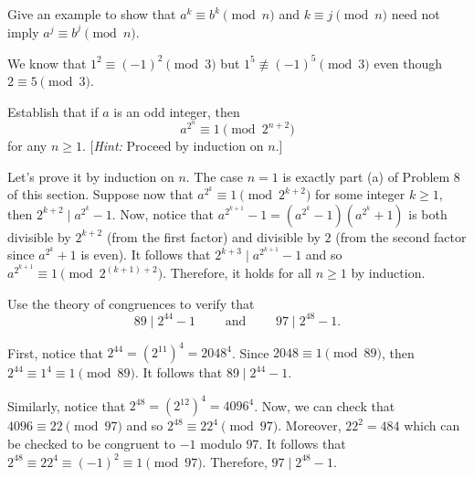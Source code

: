 \begin{exercise}
    Give an example to show that $a^k \equiv b^k \pmod n$ and $k \equiv j \pmod n$ need not imply $a^j \equiv b^j \pmod n$. \\
\end{exercise}

\begin{solution}
    We know that $1^2 \equiv (-1)^2 \pmod 3$ but $1^5 \not\equiv (-1)^5 \pmod 3$ even though $2 \equiv 5 \pmod 3$. \\
\end{solution}

\begin{exercise}
    Establish that if $a$ is an odd integer, then
    $$a^{2^n} \equiv 1 \pmod{2^{n+2}}$$
    for any $n \geq 1$. [\textit{Hint:} Proceed by induction on $n$.] \\
\end{exercise}

\begin{solution}
    Let's prove it by induction on $n$. The case $n = 1$ is exactly part (a) of Problem 8 of this section. Suppose now that $a^{2^k} \equiv 1 \pmod{2^{k+2}}$ for some integer $k \geq 1$, then $2^{k+2} \mid a^{2^k} - 1$. Now, notice that $a^{2^{k+1}} - 1 = (a^{2^k} - 1)(a^{2^k} + 1)$ is both divisible by $2^{k+2}$ (from the first factor) and divisible by $2$ (from the second factor since $a^{2^k} + 1$ is even). It follows that $2^{k+3} \mid a^{2^{k+1}} - 1$ and so $a^{2^{k+1}} \equiv 1 \pmod{2^{(k+1)+2}}$. Therefore, it holds for all $n \geq 1$ by induction. \\
\end{solution}

\begin{exercise}
    Use the theory of congruences to verify that
    $$89 \mid 2^{44} - 1 \qquad \text{ and } \qquad 97 \mid 2^{48} - 1.$$
\end{exercise}

\begin{solution}
    First, notice that $2^{44} = (2^{11})^4 = 2048^4$. Since $2048 \equiv 1 \pmod{89}$, then $2^{44} \equiv 1^4 \equiv 1 \pmod{89}$. It follows that $89 \mid 2^{44} - 1$.

    Similarly, notice that $2^{48} = (2^{12})^4 = 4096^4$. Now, we can check that $4096 \equiv 22 \pmod{97}$ and so $2^{48} \equiv 22^4 \pmod{97}$. Moreover, $22^2 = 484$ which can be checked to be congruent to $-1$ modulo $97$. It follows that $2^{48} \equiv 22^4 \equiv (-1)^2 \equiv 1 \pmod{97}$. Therefore, $97 \mid 2^{48} - 1$. \\
\end{solution}

